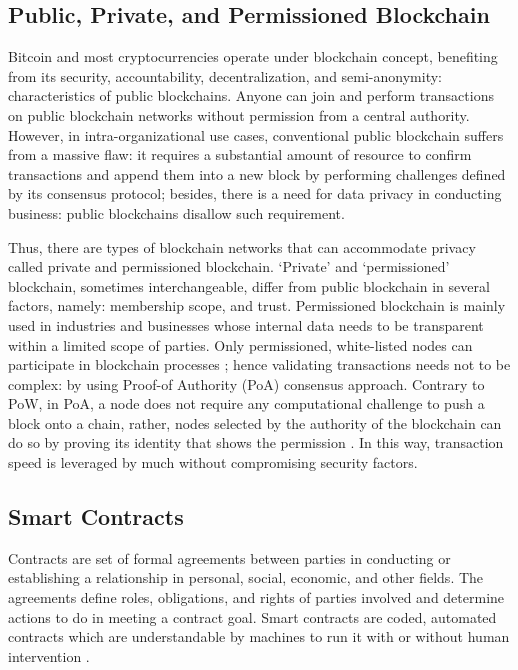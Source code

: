 \documentclass[a4paper,12pt,oneside, utf8x]{report}
\begin{document}
\subsection{Public, Private, and Permissioned Blockchain}

Bitcoin and most cryptocurrencies operate under blockchain concept, benefiting from its security, accountability, decentralization, and semi-anonymity: characteristics of public blockchains. Anyone can join and perform transactions on public blockchain networks without permission from a central authority. However, in intra-organizational use cases, conventional public blockchain suffers from a massive flaw: it requires a substantial amount of resource to confirm transactions and append them into a new block by performing challenges defined by its consensus protocol; besides, there is a need for data privacy in conducting business: public blockchains disallow such requirement.

Thus, there are types of blockchain networks that can accommodate privacy called private and permissioned blockchain. ‘Private’ and ‘permissioned’ blockchain, sometimes interchangeable, differ from public blockchain in several factors, namely: membership scope, and trust. Permissioned blockchain is mainly used in industries and businesses whose internal data needs to be transparent within a limited scope of parties. Only permissioned, white-listed nodes can participate in blockchain processes \cite{a21}; hence validating transactions needs not to be complex: by using Proof-of Authority (PoA) consensus approach. Contrary to PoW, in PoA, a node does not require any computational challenge to push a block onto a chain, rather, nodes selected by the authority of the blockchain can do so by proving its identity that shows the permission \cite{a5}. In this way, transaction speed is leveraged by much without compromising security factors.

\subsection{Smart Contracts}

Contracts are set of formal agreements between parties in conducting or establishing a relationship in personal, social, economic, and other fields. The agreements define roles, obligations, and rights of parties involved and determine actions to do in meeting a contract goal. Smart contracts are coded, automated contracts which are understandable by machines to run it with or without human intervention \cite{a22}.
\end{document}
